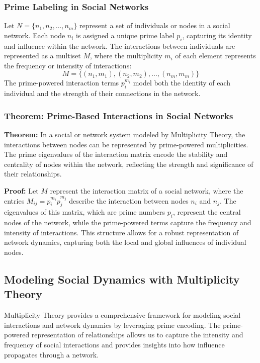 \documentclass[%
 preprint, linenumbers,
 amsmath,amssymb,
 aps, physrev,
]{revtex4-2}
\begin{document}
\subsubsection{Prime Labeling in Social Networks}
Let \( N = \{n_1, n_2, \dots, n_m\} \) represent a set of individuals or nodes in a social network. Each node \( n_i \) is assigned a unique prime label \( p_i \), capturing its identity and influence within the network. The interactions between individuals are represented as a multiset \( M \), where the multiplicity \( m_i \) of each element represents the frequency or intensity of interactions:
\[
M = \{(n_1, m_1), (n_2, m_2), \dots, (n_m, m_m)\}
\]
The prime-powered interaction terms \( p_i^{m_i} \) model both the identity of each individual and the strength of their connections in the network.

\subsubsection{Theorem: Prime-Based Interactions in Social Networks}
\textbf{Theorem:} In a social or network system modeled by Multiplicity Theory, the interactions between nodes can be represented by prime-powered multiplicities. The prime eigenvalues of the interaction matrix encode the stability and centrality of nodes within the network, reflecting the strength and significance of their relationships.

\textbf{Proof:} Let \( M \) represent the interaction matrix of a social network, where the entries \( M_{ij} = p_i^{m_i} p_j^{m_j} \) describe the interaction between nodes \( n_i \) and \( n_j \). The eigenvalues of this matrix, which are prime numbers \( p_i \), represent the central nodes of the network, while the prime-powered terms capture the frequency and intensity of interactions. This structure allows for a robust representation of network dynamics, capturing both the local and global influences of individual nodes.

\subsection{Modeling Social Dynamics with Multiplicity Theory}
Multiplicity Theory provides a comprehensive framework for modeling social interactions and network dynamics by leveraging prime encoding. The prime-powered representation of relationships allows us to capture the intensity and frequency of social interactions and provides insights into how influence propagates through a network.
\end{document}
